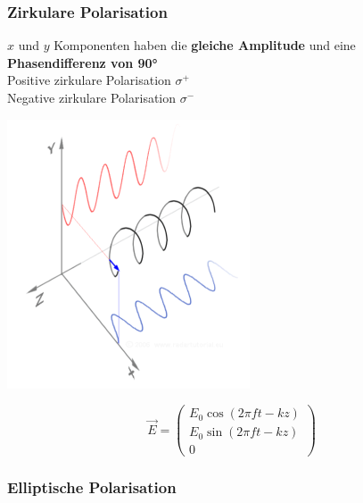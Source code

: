 


\subsubsection{Zirkulare Polarisation}

$x$ und $y$ Komponenten haben die \textbf{gleiche Amplitude} und eine \textbf{Phasendifferenz von 90°} \\

Positive zirkulare Polarisation $\sigma ^+$ \\
Negative zirkulare Polarisation $\sigma ^-$ \\


\begin{minipage}{0.48\linewidth}
\includegraphics[width=0.8\linewidth]{Bilder/Wellen-Optik/Zirkulare_Polarisation}
\end{minipage}
\hfill
\begin{minipage}{0.48\linewidth}
$$ \boxed{ \vec{E} = \begin{pmatrix} E_0 \cos(2 \pi ft-kz) \\ E_0 \sin(2 \pi ft -kz) \\ 0 \end{pmatrix}  } $$

\end{minipage}

\subsubsection{Elliptische Polarisation}

